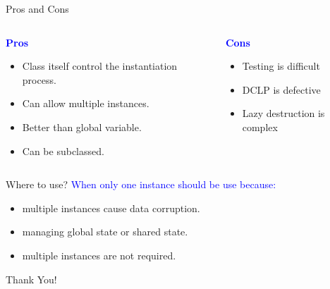 \documentclass[13pt]{beamer}
\begin{document}
\begin{frame}{Pros and Cons}
\begin{columns}[T]
\begin{column}{.45\textwidth}
	\begin{center}
	\textcolor{blue}{\textbf{Pros}}
	\end{center}
	\begin{itemize}
		\setlength\itemsep{1em}
		\item Class itself control the instantiation process.
		\item Can allow multiple instances.
		\item Better than global variable.
		\item Can be subclassed.
	\end{itemize}
\end{column}
\begin{column}{.45\textwidth}
	\begin{center}
	\textcolor{blue}{\textbf{Cons}}
	\end{center}
		\begin{itemize}
		\setlength\itemsep{1em}
		\item Testing is difficult
		\item DCLP is defective
		\item Lazy destruction is complex
	\end{itemize}
\end{column}
\end{columns}
\end{frame}

\begin{frame}{Where to use?}
	\textcolor{blue}{When only one instance should be use because:}
	\begin{itemize}
		\setlength\itemsep{1em}
		\item multiple instances cause data corruption.
		\item managing global state or shared state.
		\item multiple instances are not required.
	\end{itemize}
\end{frame}

\begin{frame}
\begin{center}
{\fontsize{40}{50}\selectfont Thank You!}
\end{center}
\end{frame}
\end{document}
